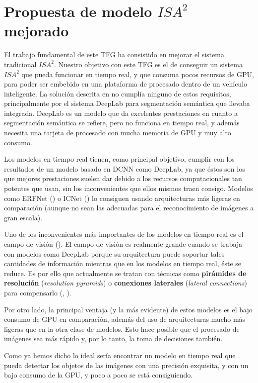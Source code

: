 \section{Propuesta de modelo $ISA^{2}$ mejorado}
\label{sec:isa2_modelo_nuevo}
El trabajo fundamental de este TFG ha consistido en mejorar el sistema tradicional $ISA^{2}$. Nuestro objetivo con este TFG es el de conseguir un sistema $ISA^{2}$ que pueda funcionar en tiempo real, y que consuma pocos recursos de \ac{GPU}, para poder ser embebido en una plataforma de procesado dentro de un vehículo inteligente. La solución descrita en \cite{isa2} no cumplía ninguno de estos requisitos, principalmente por el sistema DeepLab para segmentación semántica que llevaba integrada. DeepLab es un modelo que da excelentes prestaciones en cuanto a segmentación semántica se refiere, pero no funciona en tiempo real, y además necesita una tarjeta de procesado con mucha memoria de \ac{GPU} y muy alto consumo.

Los modelos en tiempo real tienen, como principal objetivo, cumplir con los resultados de un modelo basado en \ac{DCNN} como DeepLab, ya que éstos son los que mejores prestaciones suelen dar debido a los recursos computacionales tan potentes que usan, sin los inconvenientes que ellos mismos traen consigo. Modelos como ERFNet (\cite{erfnet}) o ICNet (\cite{icnet}) lo consiguen usando arquitecturas más ligeras en comparación (aunque no sean las adecuadas para el reconocimiento de imágenes a gran escala).

Uno de los inconvenientes más importantes de los modelos en tiempo real es el campo de visión (\cite{swiftnet}). El campo de visión es realmente grande cuando se trabaja con modelos como DeepLab porque su arquitectura puede soportar tales cantidades de información mientras que en los modelos en tiempo real, éste se reduce. Es por ello que actualmente se tratan con técnicas como \textbf{pirámides de resolución} (\textit{resolution pyramids}) o \textbf{conexiones laterales} (\textit{lateral connections}) para compensarlo (\cite{res_pyr}, \cite{lat_con}).

Por otro lado, la principal ventaja (y la más evidente) de estos modelos es el bajo consumo de \ac{GPU} en comparación, además del uso de arquitecturas mucho más ligeras que en la otra clase de modelos. Esto hace posible que el procesado de imágenes sea más rápido y, por lo tanto, la toma de decisiones también.

Como ya hemos dicho lo ideal sería encontrar un modelo en tiempo real que pueda detectar los objetos de las imágenes con una precisión exquisita, y con un bajo consumo de la \ac{GPU}, y poco a poco se está consiguiendo.


